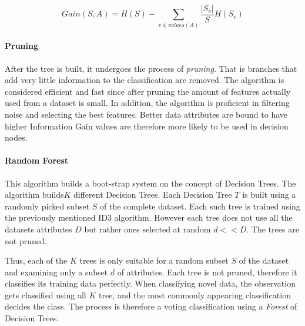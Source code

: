 			\begin{equation}
			Gain(S,A) = H(S) - \sum_{v \in values(A) } \frac{|S_v|}{S} H(S_v)
			\label{dt_info_gain}
	 \end{equation}
	 
	 \paragraph{Pruning}
		 After the tree is built, it undergoes the process of \textit{pruning}. That is branches that add very little information to the classification are removed. The algorithm is considered efficient and fast since after pruning the amount of features actually used from a dataset is small. In addition, the algorithm is proficient in filtering noise and selecting the best features. Better data attributes are bound to have higher Information Gain values are therefore more likely to be used in decision nodes.
	
	\paragraph{Random Forest}
		This algorithm builds a boot-strap system on the concept of Decision Trees. The algorithm \cite{breiman1984classification} builds$ K $ different Decision Trees. Each Decision Tree $ T $ is built using a randomly picked subset $ S $ of the complete dataset. Each such tree is trained using the previously mentioned ID3 algorithm. However each tree does not use all the datasets attributes $ D $ but rather ones selected at random $ d << D $. The trees are not pruned. 
		
		\par
		Thus, each of the $ K $ trees is only suitable for a random subset $ S $ of the dataset and examining only a subset $ d $ of attributes. Each tree is not pruned, therefore it classifies its training data perfectly. When classifying novel data, the observation gets classified using all $ K $ tree, and the most commonly appearing classification decides the class. The process is therefore a voting classification using a \textit{Forest} of Decision Trees.
 
	
	
